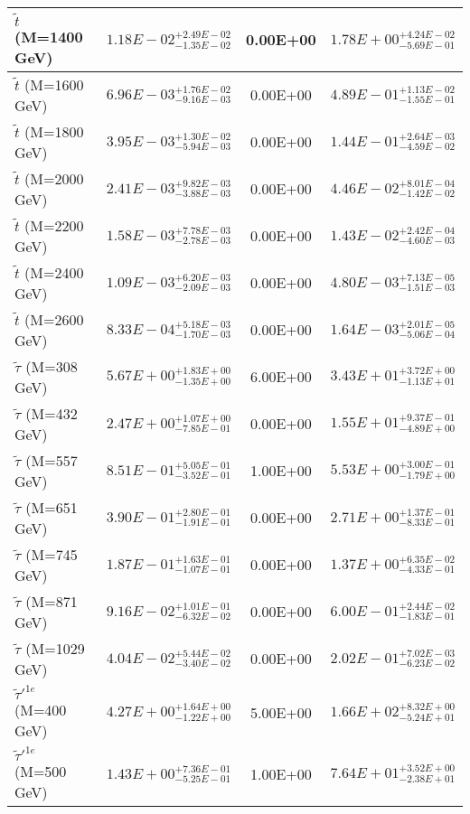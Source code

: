\documentclass{article}
\begin{document}
\begin{center}
\begin{tabular}{ |l|c|c|c| }
 \hline
 $\tilde{t}$ (M=1400 GeV) & $1.18E-02^{+2.49E-02}_{-1.35E-02}$ & 0.00E+00 & $1.78E+00^{+4.24E-02}_{-5.69E-01}$ \\
 \hline
 $\tilde{t}$ (M=1600 GeV) & $6.96E-03^{+1.76E-02}_{-9.16E-03}$ & 0.00E+00 & $4.89E-01^{+1.13E-02}_{-1.55E-01}$ \\
 \hline
 $\tilde{t}$ (M=1800 GeV) & $3.95E-03^{+1.30E-02}_{-5.94E-03}$ & 0.00E+00 & $1.44E-01^{+2.64E-03}_{-4.59E-02}$ \\
 \hline
 $\tilde{t}$ (M=2000 GeV) & $2.41E-03^{+9.82E-03}_{-3.88E-03}$ & 0.00E+00 & $4.46E-02^{+8.01E-04}_{-1.42E-02}$ \\
 \hline
 $\tilde{t}$ (M=2200 GeV) & $1.58E-03^{+7.78E-03}_{-2.78E-03}$ & 0.00E+00 & $1.43E-02^{+2.42E-04}_{-4.60E-03}$ \\
 \hline
 $\tilde{t}$ (M=2400 GeV) & $1.09E-03^{+6.20E-03}_{-2.09E-03}$ & 0.00E+00 & $4.80E-03^{+7.13E-05}_{-1.51E-03}$ \\
 \hline
 $\tilde{t}$ (M=2600 GeV) & $8.33E-04^{+5.18E-03}_{-1.70E-03}$ & 0.00E+00 & $1.64E-03^{+2.01E-05}_{-5.06E-04}$ \\
 \hline
 $\tilde{\tau}$ (M=308 GeV) & $5.67E+00^{+1.83E+00}_{-1.35E+00}$ & 6.00E+00 & $3.43E+01^{+3.72E+00}_{-1.13E+01}$ \\
 \hline
 $\tilde{\tau}$ (M=432 GeV) & $2.47E+00^{+1.07E+00}_{-7.85E-01}$ & 0.00E+00 & $1.55E+01^{+9.37E-01}_{-4.89E+00}$ \\
 \hline
 $\tilde{\tau}$ (M=557 GeV) & $8.51E-01^{+5.05E-01}_{-3.52E-01}$ & 1.00E+00 & $5.53E+00^{+3.00E-01}_{-1.79E+00}$ \\
 \hline
 $\tilde{\tau}$ (M=651 GeV) & $3.90E-01^{+2.80E-01}_{-1.91E-01}$ & 0.00E+00 & $2.71E+00^{+1.37E-01}_{-8.33E-01}$ \\
 \hline
 $\tilde{\tau}$ (M=745 GeV) & $1.87E-01^{+1.63E-01}_{-1.07E-01}$ & 0.00E+00 & $1.37E+00^{+6.35E-02}_{-4.33E-01}$ \\
 \hline
 $\tilde{\tau}$ (M=871 GeV) & $9.16E-02^{+1.01E-01}_{-6.32E-02}$ & 0.00E+00 & $6.00E-01^{+2.44E-02}_{-1.83E-01}$ \\
 \hline
 $\tilde{\tau}$ (M=1029 GeV) & $4.04E-02^{+5.44E-02}_{-3.40E-02}$ & 0.00E+00 & $2.02E-01^{+7.02E-03}_{-6.23E-02}$ \\
 \hline
 $\tilde{\tau}'^{1e}$ (M=400 GeV) & $4.27E+00^{+1.64E+00}_{-1.22E+00}$ & 5.00E+00 & $1.66E+02^{+8.32E+00}_{-5.24E+01}$ \\
 \hline
 $\tilde{\tau}'^{1e}$ (M=500 GeV) & $1.43E+00^{+7.36E-01}_{-5.25E-01}$ & 1.00E+00 & $7.64E+01^{+3.52E+00}_{-2.38E+01}$ \\

\end{tabular}
\end{center}
\end{document}
